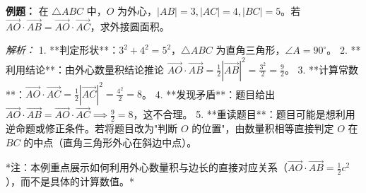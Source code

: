 \begin{examplebox}
\textbf{例题：} 在 $\triangle ABC$ 中，$O$ 为外心，$|AB|=3, |AC|=4, |BC|=5$。若 $\vec{AO} \cdot \vec{AB} = \vec{AO} \cdot \vec{AC}$，求外接圆面积。

\textit{解析：}
1.  **判定形状**：$3^2+4^2=5^2$，$\triangle ABC$ 为直角三角形，$\angle A=90^\circ$。
2.  **利用结论**：由外心数量积结论推论 $\vec{AO} \cdot \vec{AB} = \frac{1}{2}|\vec{AB}|^2 = \frac{3^2}{2} = \frac{9}{2}$。
3.  **计算常数**：$\vec{AO} \cdot \vec{AC} = \frac{1}{2}|\vec{AC}|^2 = \frac{4^2}{2} = 8$。
4.  **发现矛盾**：题目给出 $\vec{AO} \cdot \vec{AB} = \vec{AO} \cdot \vec{AC} \implies \frac{9}{2} = 8$，这不合理。
5.  **重读题目**：题目可能是想利用逆命题或修正条件。若将题目改为"判断 $O$ 的位置"，由数量积相等直接判定 $O$ 在 $BC$ 的中点（直角三角形外心在斜边中点）。

*注：本例重点展示如何利用外心数量积与边长的直接对应关系（$\vec{AO} \cdot \vec{AB} = \frac{1}{2}c^2$），而不是具体的计算数值。*
\end{examplebox}